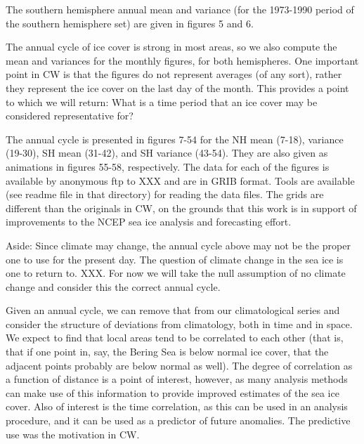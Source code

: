   The southern hemisphere annual mean and variance (for the 1973-1990 
period of the southern hemisphere set) are given in figures 5 and 6.

  The annual cycle of ice cover is strong in most areas, so we also
compute the mean and variances for the monthly figures, for both hemispheres.
One important point in CW is that the figures do not represent averages 
(of any sort), rather they represent the ice cover on the last day of the
month.  This provides a point to which we will return: What is a time
period that an ice cover may be considered representative for?

  The annual cycle is presented in figures 7-54 for the NH mean (7-18),
variance (19-30), SH mean (31-42), and SH variance (43-54).  They are
also given as animations in figures 55-58, respectively.  The data for
each of the figures is available by anonymous ftp to XXX and are in GRIB
format.  Tools are available (see readme file in that directory) for
reading the data files.  The grids are different than the originals in CW,
on the grounds that this work is in support of improvements to the NCEP 
sea ice analysis and forecasting effort.  

  Aside: Since climate may change, the annual cycle above may not be the
proper one to use for the present day.  The question of climate change in
the sea ice is one to return to.  XXX.   For now we will take the null
assumption of no climate change and consider this the correct annual cycle.

  Given an annual cycle, we can remove that from our climatological series 
and consider the structure of deviations from climatology, both in time 
and in space.  We expect to find that local areas tend to be correlated 
to each other (that is, that if one point in, say, the Bering Sea is below 
normal ice cover, that the adjacent points probably are below normal as 
well).  The degree of correlation as a function of distance is a point 
of interest, however, as many analysis methods can make use of this 
information to provide improved estimates of the sea ice cover.  Also of
interest is the time correlation, as this can be used in an analysis procedure,
and it can be used as a predictor of future anomalies.  The predictive
use was the motivation in CW.

